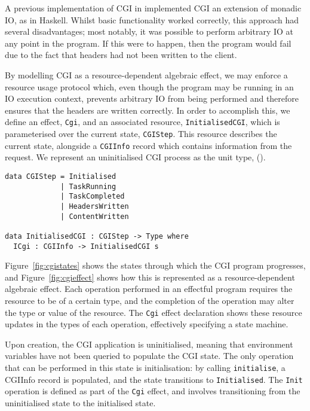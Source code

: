 A previous implementation of CGI in \idris{} implemented CGI an extension of monadic IO, as in Haskell. Whilst basic functionality worked correctly, this approach had several disadvantages; most notably, it was possible to perform arbitrary IO at any point in the program. If this were to happen, then the program would fail due to the fact that headers had not been written to the client.

By modelling CGI as a resource-dependent algebraic effect, we may enforce a resource usage protocol which, even though the program may be running in an IO execution context, prevents arbitrary IO from being performed and therefore ensures that the headers are written correctly. In order to accomplish this, we define an effect, \texttt{Cgi}, and an associated resource, \texttt{InitialisedCGI}, which is parameterised over the current state, \texttt{CGIStep}. This resource describes the current state, alongside a \texttt{CGIInfo} record which contains information from the request. We represent an uninitialised CGI process as the unit type, ().
\begin{Verbatim}[samepage]
data CGIStep = Initialised 
             | TaskRunning 
             | TaskCompleted 
             | HeadersWritten 
             | ContentWritten

data InitialisedCGI : CGIStep -> Type where
  ICgi : CGIInfo -> InitialisedCGI s
\end{Verbatim}
Figure~\ref{fig:cgistates} shows the states through which the CGI program
progresses, and Figure~\ref{fig:cgieffect} shows how this is represented
as a resource-dependent algebraic effect. Each operation performed in an effectful
program requires the resource to be of a certain type, and the completion of
the operation may alter the type or value of the resource. The \texttt{Cgi}
effect declaration shows these resource updates in the types of each operation,
effectively specifying a state machine.

Upon creation, the CGI application is uninitialised, meaning that environment variables have not been queried to populate the CGI state. The only operation
that can be performed in this state is initialisation: by calling
\texttt{initialise}, a CGIInfo record is populated, and the state transitions
to \texttt{Initialised}. The \texttt{Init} operation is defined as part of the
\texttt{Cgi} effect, and involves transitioning from the uninitialised state to
the initialised state.

